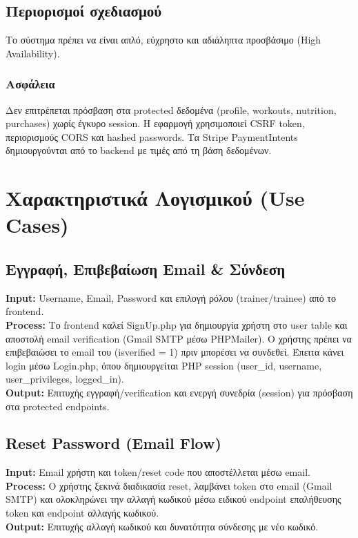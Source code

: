 \documentclass[12pt,a4paper]{report}
\begin{document}
\subsection{Περιορισμοί σχεδιασμού}
Το σύστημα πρέπει να είναι απλό, εύχρηστο και αδιάληπτα προσβάσιμο (High Availability).

\subsubsection{Ασφάλεια}
Δεν επιτρέπεται πρόσβαση στα protected δεδομένα (profile, workouts, nutrition, purchases) χωρίς έγκυρο session. Η εφαρμογή χρησιμοποιεί CSRF token, περιορισμούς CORS και hashed passwords. Τα Stripe PaymentIntents δημιουργούνται από το backend με τιμές από τη βάση δεδομένων.

\newpage

\section{Χαρακτηριστικά Λογισμικού (Use Cases)}

\subsection{Εγγραφή, Επιβεβαίωση Email \& Σύνδεση}
\textbf{Input:} Username, Email, Password και επιλογή ρόλου (\textenglish{trainer/trainee}) από το frontend. \\
\textbf{Process:} Το frontend καλεί \textenglish{SignUp.php} για δημιουργία χρήστη στο \textenglish{user} table και αποστολή email verification (Gmail SMTP μέσω PHPMailer). Ο χρήστης πρέπει να επιβεβαιώσει το email του (\textenglish{isverified = 1}) πριν μπορέσει να συνδεθεί. Έπειτα κάνει login μέσω \textenglish{Login.php}, όπου δημιουργείται PHP session (\textenglish{user\_id, username, user\_privileges, logged\_in}). \\
\textbf{Output:} Επιτυχής εγγραφή/verification και ενεργή συνεδρία (session) για πρόσβαση στα protected endpoints.

\subsection{Reset Password (Email Flow)}
\textbf{Input:} Email χρήστη και token/reset code που αποστέλλεται μέσω email. \\
\textbf{Process:} Ο χρήστης ξεκινά διαδικασία reset, λαμβάνει token στο email (Gmail SMTP) και ολοκληρώνει την αλλαγή κωδικού μέσω ειδικού endpoint επαλήθευσης token και endpoint αλλαγής κωδικού. \\
\textbf{Output:} Επιτυχής αλλαγή κωδικού και δυνατότητα σύνδεσης με νέο κωδικό.
\end{document}
